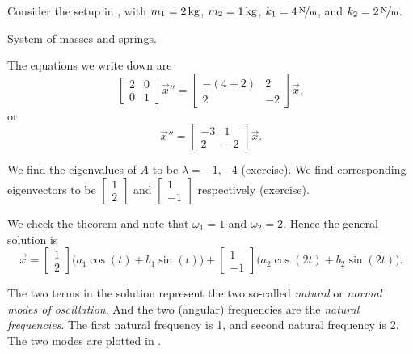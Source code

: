 \begin{example}
Consider the setup in , with
$m_1 = \unit[2]{kg}$, $m_2 = \unit[1]{kg}$, $k_1 = \unitfrac[4]{N}{m}$, and
$k_2 = \unitfrac[2]{N}{m}$.

\begin{myfig}
\capstart
{}
\caption{System of masses and springs.\label{sosa:twocartswallfig}}
\end{myfig}

The equations we write down are
\begin{equation*}
\begin{bmatrix}
2 & 0 \\
0 & 1
\end{bmatrix}
{\vec{x}}'' =
\begin{bmatrix}
-(4+2) & 2 \\
2 & -2
\end{bmatrix}
\vec{x} ,
\end{equation*}
or
\begin{equation*}
{\vec{x}}'' =
\begin{bmatrix}
-3 & 1 \\
2 & -2
\end{bmatrix}
\vec{x} .
\end{equation*}

We find the eigenvalues of $A$ to be $\lambda = -1, -4$ (exercise).
We find corresponding eigenvectors to be
$\left[ \begin{smallmatrix} 1 \\ 2 \end{smallmatrix} \right]$ and
$\left[ \begin{smallmatrix} 1 \\ -1 \end{smallmatrix} \right]$ respectively
(exercise).

We check the theorem and note that $\omega_1 = 1$ and $\omega_2 = 2$.
Hence the general solution is
\begin{equation*}
\vec{x} = 
\begin{bmatrix} 1 \\ 2 \end{bmatrix}
\bigl( a_1 \cos (t) + b_1 \sin (t) \bigr)
+
\begin{bmatrix} 1 \\ -1 \end{bmatrix}
\bigl( a_2 \cos (2t) + b_2 \sin (2t) \bigr) .
\end{equation*}

The two terms in the solution represent the two
so-called \emph{natural}
or \emph{normal modes of oscillation}.
And the two (angular) frequencies are the
\emph{natural frequencies}.
The first natural frequency is 1, and second natural frequency is 2.
The two modes are plotted in .


\end{example}
